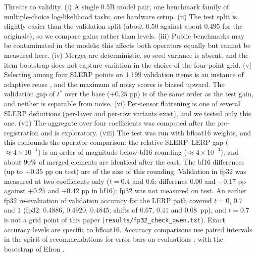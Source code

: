 \documentclass[conference]{IEEEtran}
\begin{document}
Threats to validity. (i) A single 0.5B model pair, one benchmark family of multiple-choice log-likelihood tasks, one hardware setup. (ii) The test split is slightly easier than the validation split (about $0.50$ against about $0.495$ for the originals), so we compare gains rather than levels. (iii) Public benchmarks may be contaminated in the models; this affects both operators equally but cannot be measured here. (iv) Merges are deterministic, so seed variance is absent, and the item bootstrap does not capture variation in the choice of the four-point grid. (v) Selecting among four SLERP points on 1{,}199 validation items is an instance of adaptive reuse \cite{dwork2015reusable}, and the maximum of noisy scores is biased upward. The validation gap of $t^\ast$ over the base ($+0.25$ pp) is of the same order as the test gain, and neither is separable from noise. (vi) Per-tensor flattening is one of several SLERP definitions (per-layer and per-row variants exist), and we tested only this one. (vii) The aggregate over four coefficients was computed after the pre-registration and is exploratory. (viii) The test was run with bfloat16 weights, and this confounds the operator comparison: the relative SLERP--LERP gap ($\approx4\times10^{-4}$) is an order of magnitude below bf16 rounding ($\approx4\times10^{-3}$), and about $90\%$ of merged elements are identical after the cast. The bf16 differences (up to $+0.35$ pp on test) are of the size of this rounding. Validation in fp32 was measured at two coefficients only ($t=0.4$ and $0.6$; difference $0.00$ and $-0.17$ pp against $+0.25$ and $+0.42$ pp in bf16); fp32 was not measured on test. An earlier fp32 re-evaluation of validation accuracy for the LERP path covered $t=0$, $0.7$ and $1$ (fp32: $0.4886$, $0.4920$, $0.4845$; shifts of $0.67$, $0.41$ and $0.08$~pp), and $t=0.7$ is not a grid point of this paper (\texttt{results/fp32\_check\_qwen.txt}). Exact accuracy levels are specific to bfloat16. Accuracy comparisons use paired intervals in the spirit of recommendations for error bars on evaluations \cite{miller2024errorbars}, with the bootstrap of Efron \cite{efron1979bootstrap}.
\end{document}
